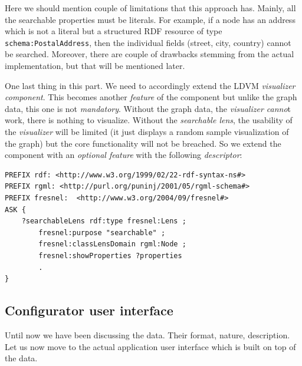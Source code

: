 Here we should mention couple of limitations that this approach has. Mainly, all the searchable properties must be literals. For example, if a node has an address which is not a literal but a structured RDF resource of type \texttt{schema:PostalAddress}, then the individual fields (street, city, country) cannot be searched. Moreover, there are couple of drawbacks stemming from the actual implementation, but that will be mentioned later.

One last thing in this part. We need to accordingly extend the LDVM \emph{visualizer component}. This becomes another \emph{feature} of the component but unlike the graph data, this one is not \emph{mandatory}. Without the graph data, the \emph{visualizer canno}t work, there is nothing to visualize. Without the \emph{searchable lens}, the usability of the \emph{visualizer} will be limited (it just displays a random sample visualization of the graph) but the core functionality will not be breached. So we extend the component with an \emph{optional feature} with the following \emph{descriptor}:

\begin{verbatim}
PREFIX rdf: <http://www.w3.org/1999/02/22-rdf-syntax-ns#>
PREFIX rgml: <http://purl.org/puninj/2001/05/rgml-schema#>
PREFIX fresnel:  <http://www.w3.org/2004/09/fresnel#>
ASK {
    ?searchableLens rdf:type fresnel:Lens ;
        fresnel:purpose "searchable" ;
        fresnel:classLensDomain rgml:Node ;
        fresnel:showProperties ?properties
        .
}
\end{verbatim}

\subsection{Configurator user interface}

Until now we have been discussing the data. Their format, nature, description. Let us now move to the actual application user interface which is built on top of the data. 

